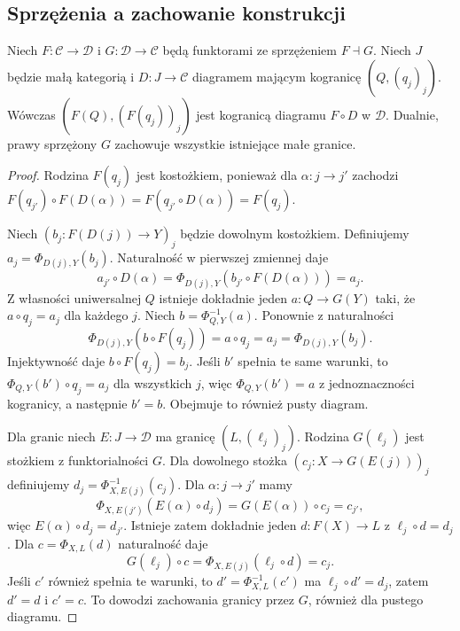 \subsection{Sprzężenia a zachowanie konstrukcji}

\begin{twierdzenie}\label{tw:adjoints-preserve}
Niech $F:\mathcal C\to\mathcal D$ i $G:\mathcal D\to\mathcal C$ będą funktorami ze sprzężeniem $F\dashv G$. Niech $J$ będzie małą kategorią i $D:J\to\mathcal C$ diagramem mającym kogranicę $(Q,(q_j)_j)$. Wówczas $(F(Q),(F(q_j))_j)$ jest kogranicą diagramu $F\circ D$ w $\mathcal D$. Dualnie, prawy sprzężony $G$ zachowuje wszystkie istniejące małe granice.
\end{twierdzenie}
\begin{proof}
Rodzina $F(q_j)$ jest kostożkiem, ponieważ dla $\alpha:j\to j'$ zachodzi $F(q_{j'})\circ F(D(\alpha))=F(q_{j'}\circ D(\alpha))=F(q_j)$.

Niech $(b_j:F(D(j))\to Y)_j$ będzie dowolnym kostożkiem. Definiujemy $a_j=\Phi_{D(j),Y}(b_j)$. Naturalność w pierwszej zmiennej daje
\[
a_{j'}\circ D(\alpha)
=\Phi_{D(j),Y}(b_{j'}\circ F(D(\alpha)))=a_j.
\]
Z własności uniwersalnej $Q$ istnieje dokładnie jeden $a:Q\to G(Y)$ taki, że $a\circ q_j=a_j$ dla każdego $j$. Niech $b=\Phi_{Q,Y}^{-1}(a)$. Ponownie z naturalności
\[
\Phi_{D(j),Y}(b\circ F(q_j))=a\circ q_j=a_j
=\Phi_{D(j),Y}(b_j).
\]
Injektywność daje $b\circ F(q_j)=b_j$. Jeśli $b'$ spełnia te same warunki, to $\Phi_{Q,Y}(b')\circ q_j=a_j$ dla wszystkich $j$, więc $\Phi_{Q,Y}(b')=a$ z jednoznaczności kogranicy, a następnie $b'=b$. Obejmuje to również pusty diagram.

Dla granic niech $E:J\to\mathcal D$ ma granicę $(L,(\ell_j)_j)$. Rodzina $G(\ell_j)$ jest stożkiem z funktorialności $G$. Dla dowolnego stożka $(c_j:X\to G(E(j)))_j$ definiujemy $d_j=\Phi_{X,E(j)}^{-1}(c_j)$. Dla $\alpha:j\to j'$ mamy
\[
\Phi_{X,E(j')}(E(\alpha)\circ d_j)
=G(E(\alpha))\circ c_j=c_{j'},
\]
więc $E(\alpha)\circ d_j=d_{j'}$. Istnieje zatem dokładnie jeden $d:F(X)\to L$ z $\ell_j\circ d=d_j$. Dla $c=\Phi_{X,L}(d)$ naturalność daje
\[
G(\ell_j)\circ c=\Phi_{X,E(j)}(\ell_j\circ d)=c_j.
\]
Jeśli $c'$ również spełnia te warunki, to $d'=\Phi_{X,L}^{-1}(c')$ ma $\ell_j\circ d'=d_j$, zatem $d'=d$ i $c'=c$. To dowodzi zachowania granicy przez $G$, również dla pustego diagramu.
\end{proof}

